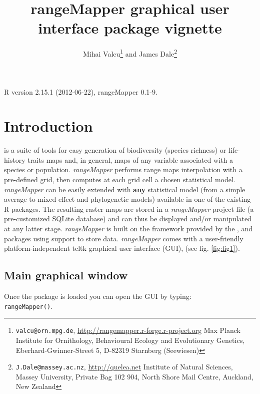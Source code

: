 \documentclass[ a4paper ]{article}
\begin{document}

\title{rangeMapper graphical user interface package vignette}
\author{
Mihai Valcu\footnote{
	\texttt{valcu@orn.mpg.de},
	\url{http://rangemapper.r-forge.r-project.org}
	Max Planck Institute for Ornithology, 
	Behavioural Ecology and Evolutionary Genetics, 
	Eberhard-Gwinner-Street 5, D-82319 Starnberg (Seewiesen)} and 
James Dale\footnote{
	\texttt{J.Dale@massey.ac.nz},
	\url{http://quelea.net}
	Institute of Natural Sciences,
	Massey University,
	Private Bag 102 904,
	North Shore Mail Centre,
	Auckland, New Zealand 
}
}

\maketitle
R version 2.15.1 (2012-06-22),
rangeMapper 0.1-9.


\section{Introduction}
	\cite{rangeMapper} is a suite of tools for easy generation of biodiversity (species richness) or life-history traits maps and, in general, maps of any variable associated with a species or population. 
	\emph{rangeMapper} performs range maps interpolation with a pre-defined grid, then computes at each grid cell a chosen statistical model. 
	\emph{rangeMapper} can be easily extended with {\bf any} statistical model (from a simple average to mixed-effect and phylogenetic models) available in one of the existing R packages.
	 The resulting raster maps are stored in a \emph{rangeMapper} project file (a pre-customized SQLite database) and 
	 can thus be displayed and/or manipulated at any latter stage.
	\emph{rangeMapper} is built on the framework provided by the \cite{sp}, \cite{maptools} and \cite{rgdal} packages using \cite{sqlite} support to store data.
	\emph{rangeMapper} comes with a user-friendly platform-independent tcltk graphical user interface (GUI), (see fig. \ref{fig:fig1}). 

\subsection{Main graphical window}
Once the package is loaded you can open the GUI by typing:\\
\texttt{rangeMapper()}.
\end{document}
